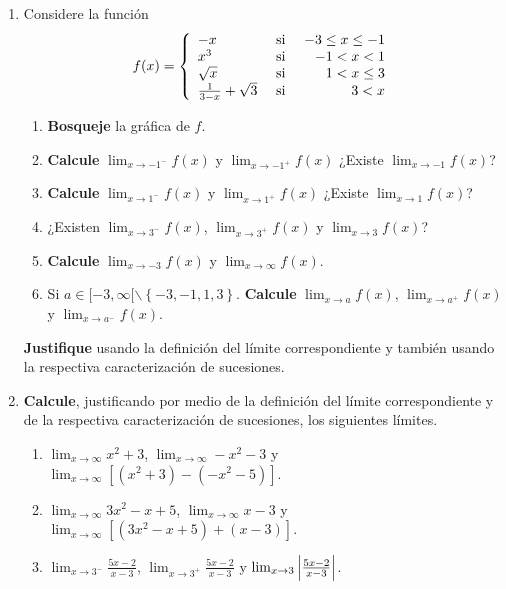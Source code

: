 \documentclass[12pt]{article}
\begin{document}
\begin{enumerate}
    \item Considere la función
    \begin{equation*}
        f(x)=\left\{
            \begin{array}{lcr}
                -x & \textup{ si } & -3\leq x\leq-1\\
                x^3 & \textup{ si } & -1< x<1\\
                \sqrt{x} & \textup{ si } & 1<x\leq3 \\
                \frac{1}{3-x}+\sqrt{3} & \textup{ si } & 3<x\\ 
            \end{array}
        \right.
    \end{equation*}
    \begin{enumerate}
        \item \textbf{Bosqueje} la gráfica de $f$.
        \item \textbf{Calcule} $\lim_{x \rightarrow-1^-}f(x)$ y $\lim_{x \rightarrow-1^+}f(x)$ ¿Existe $\lim_{x \rightarrow-1}f(x)$?
        \item \textbf{Calcule} $\lim_{x \rightarrow1^-}f(x)$ y $\lim_{x \rightarrow1^+}f(x)$ ¿Existe $\lim_{x \rightarrow1}f(x)$?
        \item ¿Existen $\lim_{x \rightarrow3^-}f(x)$, $\lim_{x \rightarrow3^+}f(x)$ y $\lim_{x \rightarrow3}f(x)$?
        \item \textbf{Calcule} $\lim_{x \rightarrow-3}f(x)$ y $\lim_{x \rightarrow\infty}f(x)$.
        \item Si $a\in[-3,\infty[\backslash\left\{-3,-1,1,3 \right\}$. \textbf{Calcule} $\lim_{ x\rightarrow a}f(x)$, $\lim_{ x\rightarrow a^+}f(x)$ y $\lim_{ x\rightarrow a^-}f(x)$.
    \end{enumerate}
    \textbf{Justifique} usando la definición del límite correspondiente y también usando la respectiva caracterización de sucesiones.

    \begin{sol}
    \end{sol}

    \item \textbf{Calcule}, justificando por medio de la definición del límite correspondiente y de la respectiva caracterización de sucesiones, los siguientes límites.
    \begin{enumerate}
        \item $\lim_{x\rightarrow\infty}x^2+3$, $\lim_{x\rightarrow\infty}-x^2-3$ y $\lim_{x\rightarrow\infty}[(x^2+3)-(-x^2-5)]$.
        \item $\lim_{x\rightarrow\infty}3x^2-x+5$, $\lim_{x\rightarrow\infty}x-3$ y $\lim_{x\rightarrow\infty}[(3x^2-x+5)+(x-3)]$.
        \item $\lim_{x\rightarrow3^-}\frac{5x-2}{x-3}$, $\lim_{x\rightarrow3^+}\frac{5x-2}{x-3}$ y $\lim_{x\rightarrow3}\left| \frac{5x-2}{x-3} \right|$.
    \end{enumerate}


\end{enumerate}
\end{document}
